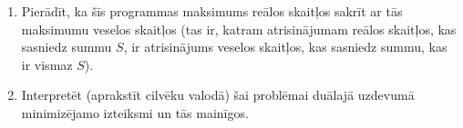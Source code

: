 \documentclass[11pt]{article}
\begin{document}
\begin{enumerate}[label=(\alph*)]
\item
Pierādīt, ka šīs programmas maksimums reālos skaitļos sakrīt ar tās 
maksimumu veselos skaitļos (tas ir, katram atrisinājumam reālos skaitļos, 
kas sasniedz summu $S$, ir atrisinājums veselos skaitļos, kas sasniedz summu,
kas ir vismaz $S$).
\item
Interpretēt (aprakstīt cilvēku valodā) šai problēmai duālajā uzdevumā 
minimizējamo izteiksmi un tās mainīgos.
\end{enumerate}
\end{document}
